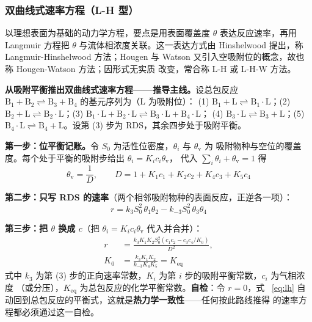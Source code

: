 \sloppy
\subsubsection{双曲线式速率方程（L-H 型）}

以理想表面为基础的动力学方程，要点是用表面覆盖度 $\theta$ 表达反应速率，再用 Langmuir
方程把 $\theta$ 与流体相浓度关联。这一表达方式由 Hinshelwood 提出，称 Langmuir-Hinshelwood
方法；Hougen 与 Watson 又引入空吸附位的概念，故也称 Hougen-Watson 方法；因形式无实质
改变，常合称 L-H 或 L-H-W 方法。

\begin{principle}
\textbf{从吸附平衡推出双曲线式速率方程——推导主线。}设总包反应
$\mathrm{B_1+B_2\rightleftharpoons B_3+B_4}$ 的基元序列为（$\mathrm{L}$ 为吸附位）：
(1) $\mathrm{B_1+L\rightleftharpoons B_1{\cdot}L}$；(2)
$\mathrm{B_2+L\rightleftharpoons B_2{\cdot}L}$；(3)
$\mathrm{B_1{\cdot}L+B_2{\cdot}L\rightleftharpoons B_3{\cdot}L+B_4{\cdot}L}$；
(4) $\mathrm{B_3{\cdot}L\rightleftharpoons B_3+L}$；(5)
$\mathrm{B_4{\cdot}L\rightleftharpoons B_4+L}$。设第 (3) 步为 RDS，其余四步处于吸附平衡。

\textbf{第一步：位平衡记账。}令 $S_0$ 为活性位密度，$\theta_i$ 与 $\theta_{\mathrm v}$ 为
吸附物种与空位的覆盖度。每个处于平衡的吸附步给出 $\theta_i=K_ic_i\theta_{\mathrm v}$，
代入 $\sum_i\theta_i+\theta_{\mathrm v}=1$ 得
\begin{equation}
\theta_{\mathrm v}=\frac{1}{D},
\qquad D=1+K_1c_1+K_2c_2+K_4c_3+K_5c_4
\label{eq:lh-D}
\end{equation}

\textbf{第二步：只写 RDS 的速率}（两个相邻吸附物种的表面反应，正逆各一项）：
\begin{equation}
r=k_3S_0^2\,\theta_1\theta_2-k_{-3}S_0^2\,\theta_3\theta_4
\label{eq:lh-rds}
\end{equation}

\textbf{第三步：把 $\theta$ 换成 $c$}（把 $\theta_i=K_ic_i\theta_{\mathrm v}$ 代入并合并）：
\begin{equation}
\begin{split}
r&=\frac{k_3K_1K_2S_0^2\left(c_1c_2-c_3c_4/K_0\right)}{D^2},\\
K_0&=\frac{k_3K_1K_2}{k_{-3}K_4K_5}=K_{\mathrm{eq}}
\end{split}
\label{eq:lh}
\end{equation}
式中 $k_3$ 为第 (3) 步的正向速率常数，$K_i$ 为第 $i$ 步的吸附平衡常数，$c_i$ 为气相浓度
（或分压），$K_{\mathrm{eq}}$ 为总包反应的化学平衡常数。\textbf{自检}：令 $r=0$，式
~\eqref{eq:lh} 自动回到总包反应的平衡式，这就是\textbf{热力学一致性}——任何按此路线推得
的速率方程都必须通过这一自检。
\end{principle}

